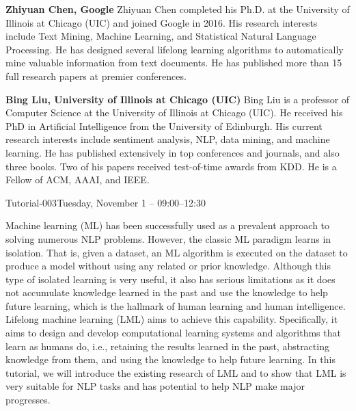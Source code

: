 \clearpage{}


\begin{bio}
\textbf{Zhiyuan Chen, Google}
 Zhiyuan Chen completed his Ph.D. at the University of Illinois at Chicago (UIC) and joined Google in 2016. His research interests include Text Mining, Machine Learning, and Statistical Natural Language Processing. He has designed several lifelong learning algorithms to automatically mine valuable information from text documents. He has published more than 15 full research papers at premier conferences.

\textbf{Bing Liu, University of Illinois at Chicago (UIC)}
 Bing Liu is a professor of Computer Science at the University of Illinois at Chicago (UIC). He received his PhD in Artificial Intelligence from the University of Edinburgh. His current research interests include sentiment analysis, NLP, data mining, and machine learning. He has published extensively in top conferences and journals, and also three books. Two of his papers received test-of-time awards from KDD. He is a Fellow of ACM, AAAI, and IEEE. 
   
\end{bio}
\begin{tutorial}{Tutorial-003}{Tuesday, November 1 -- 09:00--12:30} {\TutLocC}

Machine learning (ML) has been successfully used as a prevalent approach to solving numerous NLP problems. However, the classic ML paradigm learns in isolation. That is, given a dataset, an ML algorithm is executed on the dataset to produce a model without using any related or prior knowledge. Although this type of isolated learning is very useful, it also has serious limitations as it does not accumulate knowledge learned in the past and use the knowledge to help future learning, which is the hallmark of human learning and human intelligence. Lifelong machine learning (LML) aims to achieve this capability. Specifically, it aims to design and develop computational learning systems and algorithms that learn as humans do, i.e., retaining the results learned in the past, abstracting knowledge from them, and using the knowledge to help future learning. In this tutorial, we will introduce the existing research of LML and to show that LML is very suitable for NLP tasks and has potential to help NLP make major progresses. 

\end{tutorial} 

\clearpage{}









